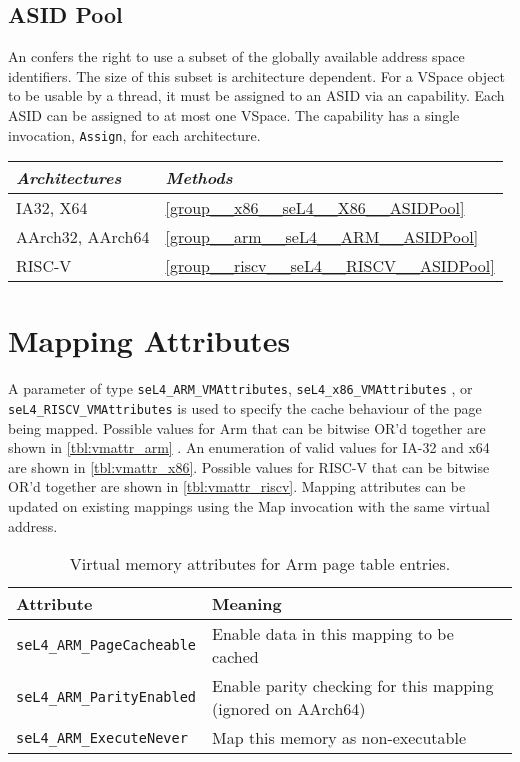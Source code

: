 \subsection{ASID Pool}

An  confers the right to use a subset of the globally available address space
identifiers. The size of this subset is architecture dependent. For a VSpace object to be usable by
a thread, it must be assigned to an ASID via an  capability. Each ASID can be
assigned to at most one VSpace. The  capability has a single invocation,
\texttt{Assign}, for each architecture.

\begin{tabularx}{\textwidth}{Xl} \toprule
\emph{Architectures} & \emph{Methods} \\ \midrule
IA32, X64            & \autoref{group__x86__seL4__X86__ASIDPool} \\
AArch32, AArch64     & \autoref{group__arm__seL4__ARM__ASIDPool} \\
RISC-V               & \autoref{group__riscv__seL4__RISCV__ASIDPool} \\
\bottomrule
\end{tabularx}

\section{Mapping Attributes}
A parameter of type \texttt{seL4\_ARM\_VMAttributes}, \texttt{seL4\_x86\_VMAttributes}
, or \texttt{seL4\_RISCV\_VMAttributes} is used to specify the cache behaviour of the
page being mapped. Possible values for Arm that can be bitwise OR'd together are
shown in \autoref{tbl:vmattr_arm} \ifxeightsix. An enumeration of valid values
for IA-32 and x64 are shown in \autoref{tbl:vmattr_x86}\fi. Possible values for RISC-V that
can be bitwise OR'd together are shown in \autoref{tbl:vmattr_riscv}. Mapping attributes
can be updated on existing mappings using the Map invocation with the same virtual address.

\begin{table}[htb]
  \begin{center}
    \begin{tabularx}{\textwidth}{p{}X}
      \toprule
      Attribute & Meaning \\
      \midrule
      \texttt{seL4\_ARM\_PageCacheable} & Enable data in this mapping
      to be cached \\
      \texttt{seL4\_ARM\_ParityEnabled} & Enable parity checking for
      this mapping (ignored on AArch64) \\
      \texttt{seL4\_ARM\_ExecuteNever} & Map this memory as non-executable \\
      \bottomrule
    \end{tabularx}
    \caption{\label{tbl:vmattr_arm} Virtual memory attributes for Arm page
      table entries.}
  \end{center}
\end{table}

